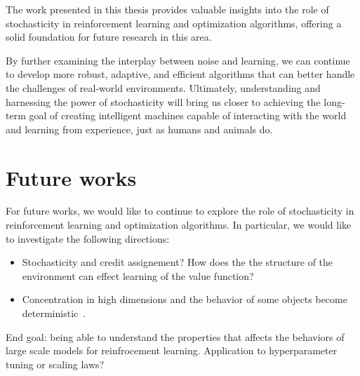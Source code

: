 The work presented in this thesis provides valuable insights into the role of stochasticity in reinforcement learning and optimization algorithms, offering a solid foundation for future research in this area.

By further examining the interplay between noise and learning, we can continue to develop more robust, adaptive, and efficient algorithms that can better handle the challenges of real-world environments. Ultimately, understanding and harnessing the power of stochasticity will bring us closer to achieving the long-term goal of creating intelligent machines capable of interacting with the world and learning from experience, just as humans and animals do.



\section*{Future works}

For future works, we would like to continue to explore the role of stochasticity in reinforcement learning and optimization algorithms. In particular, we would like to investigate the following directions:

\begin{itemize}
    \item Stochasticity and credit assignement? How does the the structure of the
environment can effect learning of the value function?

\item Concentration in high dimensions and the behavior of some objects become
deterministic~\citep{thomas2022role}.
\end{itemize}
 
End goal: being able to understand the properties that affects the behaviors of
large scale models for reinfrocement learning.
 Application to hyperparameter tuning or scaling laws?






